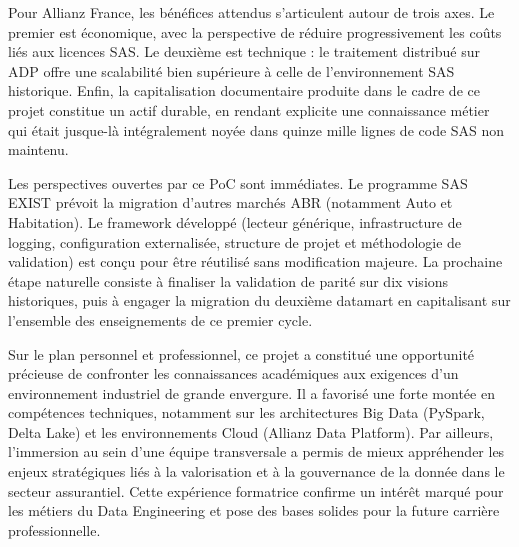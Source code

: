 Pour Allianz France, les bénéfices attendus s'articulent autour de trois axes. Le premier est économique, avec la perspective de réduire progressivement les coûts liés aux licences SAS. Le deuxième est technique : le traitement distribué sur ADP offre une scalabilité bien supérieure à celle de l'environnement SAS historique. Enfin, la capitalisation documentaire produite dans le cadre de ce projet constitue un actif durable, en rendant explicite une connaissance métier qui était jusque-là intégralement noyée dans quinze mille lignes de code SAS non maintenu.

Les perspectives ouvertes par ce PoC sont immédiates. Le programme SAS EXIST prévoit la migration d'autres marchés ABR (notamment Auto et Habitation). Le framework développé (lecteur générique, infrastructure de logging, configuration externalisée, structure de projet et méthodologie de validation) est conçu pour être réutilisé sans modification majeure. La prochaine étape naturelle consiste à finaliser la validation de parité sur dix visions historiques, puis à engager la migration du deuxième datamart en capitalisant sur l'ensemble des enseignements de ce premier cycle.

Sur le plan personnel et professionnel, ce projet a constitué une opportunité précieuse de confronter les connaissances académiques aux exigences d'un environnement industriel de grande envergure. Il a favorisé une forte montée en compétences techniques, notamment sur les architectures Big Data (PySpark, Delta Lake) et les environnements Cloud (Allianz Data Platform). Par ailleurs, l'immersion au sein d'une équipe transversale a permis de mieux appréhender les enjeux stratégiques liés à la valorisation et à la gouvernance de la donnée dans le secteur assurantiel. Cette expérience formatrice confirme un intérêt marqué pour les métiers du Data Engineering et pose des bases solides pour la future carrière professionnelle.